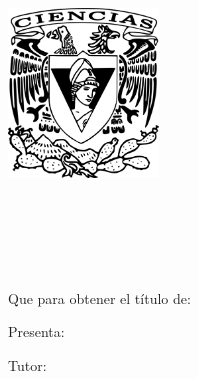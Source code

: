 
  
\begin{titlepage}
\AddToShipoutPicture*{\BackgroundPic}



\begin{addmargin}[-1cm]{-1cm}
\begin{center}
        \large

       \vspace{2cm}
        \includegraphics[width=4.0cm]{gfx/Escudo-FCIENCIAS.pdf} \\ \medskip
        \begingroup
            \spacedallcaps{\myUni} \\ \bigskip
        \endgroup
        
        \vfil
        
        \begingroup
            \spacedallcaps{\myFaculty} \\ \bigskip
        \endgroup
        
        \hfill

        \vfill
        
        \begingroup
            \color{CTtitle}\spacedallcaps{\myTitle} \\ \bigskip
        \endgroup
        \vfill
        \\[1.2cm]
        
        Que para obtener el título de: \\ \bigskip
        \myDegree

        \vspace{1.4cm}
        Presenta: \\ \bigskip
        \large{\spacedlowsmallcaps{\myName}}

        \vfill

        Tutor: \\ \bigskip
        \mySupervisor

      
        \vfill
        \myLocation \myTime\ %

        \vfill

\end{center}

\end{addmargin}
\end{titlepage}
